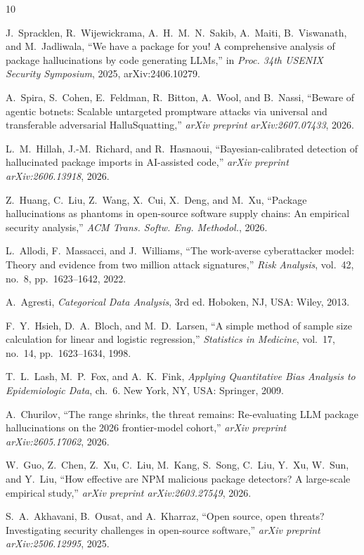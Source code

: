 \documentclass[10pt,conference]{IEEEtran}
\begin{document}
\begin{thebibliography}{10}

J.~Spracklen, R.~Wijewickrama, A.~H.~M.~N.~Sakib, A.~Maiti, B.~Viswanath, and M.~Jadliwala, ``We have a package for you! A comprehensive analysis of package hallucinations by code generating LLMs,'' in \textit{Proc. 34th USENIX Security Symposium}, 2025, arXiv:2406.10279.

A.~Spira, S.~Cohen, E.~Feldman, R.~Bitton, A.~Wool, and B.~Nassi, ``Beware of agentic botnets: Scalable untargeted promptware attacks via universal and transferable adversarial HalluSquatting,'' \textit{arXiv preprint arXiv:2607.07433}, 2026.

L.~M.~Hillah, J.-M.~Richard, and R.~Hasnaoui, ``Bayesian-calibrated detection of hallucinated package imports in AI-assisted code,'' \textit{arXiv preprint arXiv:2606.13918}, 2026.

Z.~Huang, C.~Liu, Z.~Wang, X.~Cui, X.~Deng, and M.~Xu, ``Package hallucinations as phantoms in open-source software supply chains: An empirical security analysis,'' \textit{ACM Trans. Softw. Eng. Methodol.}, 2026.

L.~Allodi, F.~Massacci, and J.~Williams, ``The work-averse cyberattacker model: Theory and evidence from two million attack signatures,'' \textit{Risk Analysis}, vol.~42, no.~8, pp.~1623--1642, 2022.

A.~Agresti, \textit{Categorical Data Analysis}, 3rd ed. Hoboken, NJ, USA: Wiley, 2013.

F.~Y.~Hsieh, D.~A.~Bloch, and M.~D.~Larsen, ``A simple method of sample size calculation for linear and logistic regression,'' \textit{Statistics in Medicine}, vol.~17, no.~14, pp.~1623--1634, 1998.

T.~L.~Lash, M.~P.~Fox, and A.~K.~Fink, \textit{Applying Quantitative Bias Analysis to Epidemiologic Data}, ch.~6. New York, NY, USA: Springer, 2009.

A.~Churilov, ``The range shrinks, the threat remains: Re-evaluating LLM package hallucinations on the 2026 frontier-model cohort,'' \textit{arXiv preprint arXiv:2605.17062}, 2026.

W.~Guo, Z.~Chen, Z.~Xu, C.~Liu, M.~Kang, S.~Song, C.~Liu, Y.~Xu, W.~Sun, and Y.~Liu, ``How effective are NPM malicious package detectors? A large-scale empirical study,'' \textit{arXiv preprint arXiv:2603.27549}, 2026.

S.~A.~Akhavani, B.~Ousat, and A.~Kharraz, ``Open source, open threats? Investigating security challenges in open-source software,'' \textit{arXiv preprint arXiv:2506.12995}, 2025.

\end{thebibliography}
\end{document}
